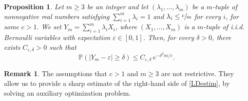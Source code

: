 \documentclass[10pt]{amsart}
\newtheorem{proposition}{Proposition}
\theoremstyle{definition}
\newtheorem{remark}{Remark}
\begin{document}
\begin{proposition}\label{prop:largeDev}
Let $m \geq 3$ be an integer and let $(\lambda_1,\ldots,\lambda_m)$ be a $m$-tuple of nonnegative real numbers satisfying $\sum_{i=1}^m \lambda_i = 1$ and $\lambda_i \leq \sfrac{c}{m}$ for every $i$, for some $c>1$.
We set $Y_m = \sum_{i=1}^m \lambda_{i} X_i$, where $(X_1,\ldots,X_m)$ is a $m$-tuple of i.i.d. Bernoulli variables with expectation $\varepsilon \in [0,1]$.
Then, for every $\delta >0$, there exists $C_{\varepsilon,\delta}>0$ such that
\begin{equation}\label{LDestim}
\mathbb{P}( |Y_m - \varepsilon| \geq \delta) \leq C_{\varepsilon, \delta} \, e^{-\delta^2 m/c }.
\end{equation}
\end{proposition}

\begin{remark}
The assumptions that $c>1$ and $m\geq 3$ are not restrictive. They allow us to provide a sharp estimate of the right-hand side of \eqref{LDestim}, by solving an auxiliary optimization problem.
\end{remark}
\end{document}
